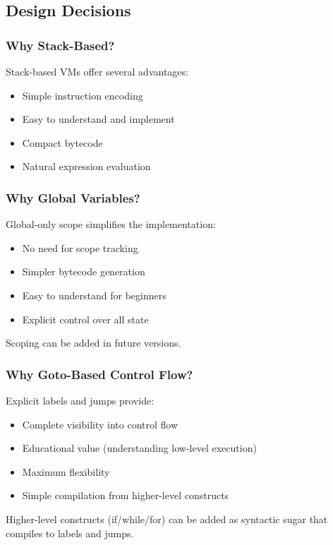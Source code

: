 \documentclass[11pt,a4paper]{article}
\begin{document}
\subsection{Design Decisions}

\subsubsection{Why Stack-Based?}

Stack-based VMs offer several advantages:
\begin{itemize}
    \item Simple instruction encoding
    \item Easy to understand and implement
    \item Compact bytecode
    \item Natural expression evaluation
\end{itemize}

\subsubsection{Why Global Variables?}

Global-only scope simplifies the implementation:
\begin{itemize}
    \item No need for scope tracking
    \item Simpler bytecode generation
    \item Easy to understand for beginners
    \item Explicit control over all state
\end{itemize}

Scoping can be added in future versions.

\subsubsection{Why Goto-Based Control Flow?}

Explicit labels and jumps provide:
\begin{itemize}
    \item Complete visibility into control flow
    \item Educational value (understanding low-level execution)
    \item Maximum flexibility
    \item Simple compilation from higher-level constructs
\end{itemize}

Higher-level constructs (if/while/for) can be added as syntactic sugar that compiles to labels and jumps.
\end{document}
